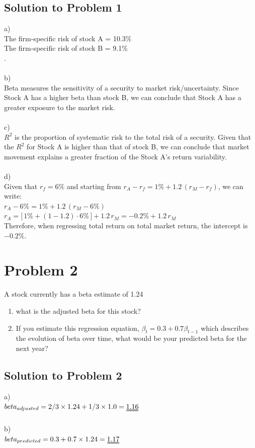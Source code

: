 \documentclass[12]{article}
\begin{document}
\subsection*{Solution to Problem 1}
a)\\
The firm-specific risk of stock A = 10.3\%\\
The firm-specific risk of stock B = 9.1\%\\
.\\
\\
b)\\
Beta measures the sensitivity of a security to market risk/uncertainty. Since Stock A has a higher beta than stock B, we can conclude that Stock A has a greater exposure to the market risk.\\
\\
c)\\
$R^2$ is the proportion of systematic risk to the total risk of a security. Given that the $R^2$ for Stock A is higher than that of stock B, we can conclude that market movement explains a greater fraction of the Stock A's return variability.\\
\\
d)\\
Given that \( r_f = 6\% \) and starting from \( r_A - r_f = 1\% + 1.2\,(r_M - r_f) \), we can write:\\
\( r_A - 6\% = 1\% + 1.2\,(r_M - 6\%) \)\\
\( r_A = \big[\,1\% + (1-1.2)\cdot 6\%\,\big] + 1.2\,r_M = -0.2\% + 1.2\,r_M \)\\
Therefore, when regressing total return on total market return, the intercept is \(-0.2\%\).




\color{black}
\section*{Problem 2}
A stock currently has a beta estimate of 1.24
\begin{enumerate}
    \item[a)] what is the adjusted beta for this stock?
    \item[b)] If you estimate this regression equation, $\beta_t = 0.3 + 0.7\beta_{t-1}$ which describes the evolution of beta over time, what would be your predicted beta for the next year?
\end{enumerate}


\color{blue}
\subsection*{Solution to Problem 2}
a)\\
$beta_{adjusted} = 2/3 \times 1.24 + 1/3 \times 1.0 = \uuline{1.16}$\\
\\
b)\\
$beta_{predicted} =0.3  + 0.7 \times 1.24 = \uuline{1.17}$\\
\end{document}
